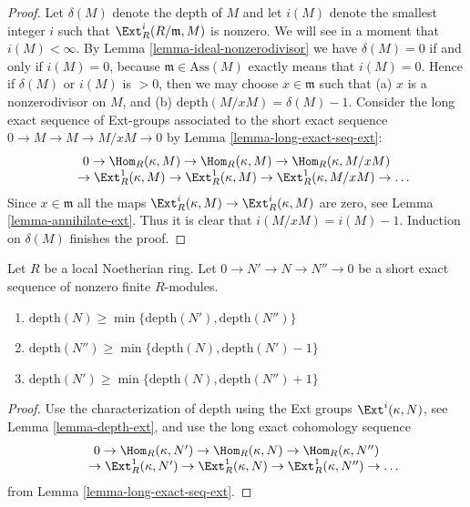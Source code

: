 \begin{proof}
Let $\delta(M)$ denote the depth of $M$ and let $i(M)$ denote
the smallest integer $i$ such that $\Ext^i_R(R/\mathfrak m, M)$
is nonzero. We will see in a moment that $i(M) < \infty$.
By Lemma \ref{lemma-ideal-nonzerodivisor} we have
$\delta(M) = 0$ if and only if $i(M) = 0$, because
$\mathfrak m \in \text{Ass}(M)$ exactly means
that $i(M) = 0$. Hence if $\delta(M)$ or $i(M)$ is $> 0$, then we may
choose $x \in \mathfrak m$ such that (a) $x$ is a nonzerodivisor
on $M$, and (b) $\text{depth}(M/xM) = \delta(M) - 1$.
Consider the long exact sequence
of Ext-groups associated to the short exact sequence
$0 \to M \to M \to M/xM \to 0$ by Lemma \ref{lemma-long-exact-seq-ext}:
$$
\begin{matrix}
0
\to \Hom_R(\kappa, M)
\to \Hom_R(\kappa, M)
\to \Hom_R(\kappa, M/xM)
\\
\phantom{0\ }
\to \Ext^1_R(\kappa, M)
\to \Ext^1_R(\kappa, M)
\to \Ext^1_R(\kappa, M/xM)
\to \ldots
\end{matrix}
$$
Since $x \in \mathfrak m$ all the maps $\Ext^i_R(\kappa, M)
\to \Ext^i_R(\kappa, M)$ are zero, see
Lemma \ref{lemma-annihilate-ext}.
Thus it is clear that $i(M/xM) = i(M) - 1$. Induction on
$\delta(M)$ finishes the proof.
\end{proof}

\begin{lemma}
\label{lemma-depth-in-ses}
Let $R$ be a local Noetherian ring. Let $0 \to N' \to N \to N'' \to 0$
be a short exact sequence of nonzero finite $R$-modules.
\begin{enumerate}
\item
$\text{depth}(N) \geq \min\{\text{depth}(N'), \text{depth}(N'')\}$
\item
$\text{depth}(N'') \geq \min\{\text{depth}(N), \text{depth}(N') - 1\}$
\item
$\text{depth}(N') \geq \min\{\text{depth}(N), \text{depth}(N'') + 1\}$
\end{enumerate}
\end{lemma}

\begin{proof}
Use the characterization of depth using the Ext groups
$\Ext^i(\kappa, N)$, see Lemma \ref{lemma-depth-ext},
and use the long exact cohomology sequence
$$
\begin{matrix}
0
\to \Hom_R(\kappa, N')
\to \Hom_R(\kappa, N)
\to \Hom_R(\kappa, N'')
\\
\phantom{0\ }
\to \Ext^1_R(\kappa, N')
\to \Ext^1_R(\kappa, N)
\to \Ext^1_R(\kappa, N'')
\to \ldots
\end{matrix}
$$
from Lemma \ref{lemma-long-exact-seq-ext}.
\end{proof}

